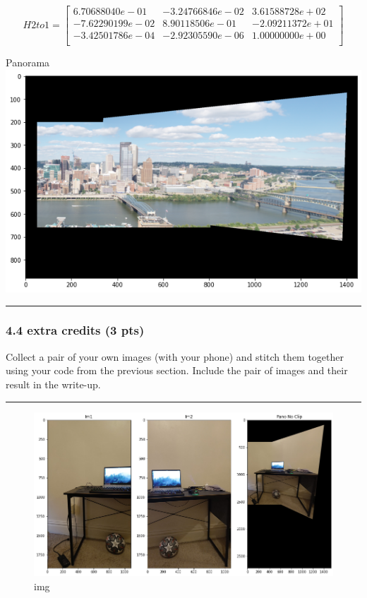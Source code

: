 \documentclass[11pt]{article}
\begin{document}
\[H2to1= \begin{bmatrix}
6.70688040e-01 & -3.24766846e-02 & 3.61588728e+02\\
-7.62290199e-02 & 8.90118506e-01 & -2.09211372e+01\\
-3.42501786e-04 & -2.92305590e-06 & 1.00000000e+00\\
 \end{bmatrix}\]

Panorama \includegraphics{results/q4_3.png}

\begin{center}\rule{0.5\linewidth}{0.5pt}\end{center}

    \hypertarget{extra-credits-3-pts}{%
\subsubsection{4.4 extra credits (3 pts)}\label{extra-credits-3-pts}}

Collect a pair of your own images (with your phone) and stitch them
together using your code from the previous section. Include the pair of
images and their result in the write-up.

    \begin{center}\rule{0.5\linewidth}{0.5pt}\end{center}

\begin{figure}
\centering
\includegraphics{results/q4_4.png}
\caption{img}
\end{figure}
\end{document}
